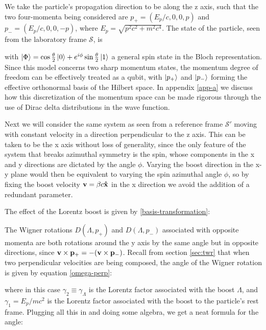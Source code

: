 \documentclass[12pt,a4paper,notitlepage]{report}
\begin{document}
We take the particle's propagation direction to be along the z axis, such that the two four-momenta being considered are $p_+ = (E_p/c,0,0,p)$ and $p_- = (E_p/c, 0, 0, -p)$, where $E_p = \sqrt{p^2c^2 + m^2c^4}$. The state of the particle, seen from the laboratory frame $\mathcal{S}$, is

%
with $\ket{\Phi} = \cos\frac{\theta}{2}\ket{0} + e^{i\phi}\sin\frac{\theta}{2}\ket{1}$ a general spin state in the Bloch representation. Since this model concerns two sharp momentum states, the momentum degree of freedom can be effectively treated as a qubit, with $\ket{p_+}$ and $\ket{p_-}$ forming the effective orthonormal basis of the Hilbert space. In appendix \ref{app-a} we discuss how this discretization of the momentum space can be made rigorous through the use of Dirac delta distributions in the  wave function.

Next we will consider the same system as seen from a reference frame $\mathcal{S}'$ moving with constant velocity in a direction perpendicular to the z axis. This can be taken to be the x axis without loss of generality, since the only feature of the system that breaks azimuthal symmetry is the spin, whose components in the x and y directions are dictated by the angle $\phi$. Varying the boost direction in the x-y plane would then be equivalent to varying the spin azimuthal angle $\phi$, so by fixing the boost velocity $\vb{v} = \beta c \vu{x}$ in the x direction we avoid the addition of a redundant parameter.

The effect of the Lorentz boost is given by \eqref{basis-transformation}:

%
The Wigner rotations $D(\Lambda, p_+)$ and $D(\Lambda, p_-)$ associated with opposite momenta are both rotations around the y axis by the same angle but in opposite directions, since $\vb{v} \times \vb{p_+} = - (\vb{v} \times \vb{p_-})$. Recall from section \ref{sec:twr} that when two perpendicular velocities are being composed, the angle of the Wigner rotation is given by equation \eqref{omega-perp}:

%
where in this case $\gamma_2 \equiv \gamma_\Lambda$ is the Lorentz factor associated with the boost $\Lambda$, and $\gamma_1 = E_p/mc^2$ is the Lorentz factor associated with the boost to the particle's rest frame. Plugging all this in and doing some algebra, we get a neat formula for the angle:
\end{document}
